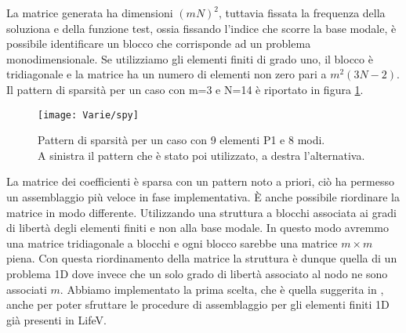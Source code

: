  La matrice generata ha dimensioni $(mN)^2$, tuttavia fissata
 la frequenza della soluziona e della funzione test, ossia fissando l'indice che scorre la base modale,
 \`e possibile identificare un blocco che corrisponde ad un problema monodimensionale.
Se utilizziamo gli elementi finiti di grado uno, il blocco \`e tridiagonale e
 la matrice ha un numero di elementi non zero pari a $m^2(3N-2)$. 
 Il pattern di sparsit\`a per un caso con m=3 e N=14 \`e riportato in figura \ref{fig:pattern}.
 \begin{figure}[!h]
    \centering
    \texttt{[image: Varie/spy]}
    \caption{Pattern di sparsit\`a per un caso con 9 elementi P1 e 8 modi.\\A sinistra il pattern che \`e stato poi utilizzato, a destra l'alternativa.}
    \label{fig:pattern}
\end{figure}
La matrice dei coefficienti \`e sparsa con un pattern noto a priori, ci\`o ha permesso 
 un assemblaggio pi\`u veloce in fase implementativa.
 \`E anche possibile riordinare la matrice in modo differente. Utilizzando una struttura 
 a blocchi associata ai gradi di libert\`a degli elementi finiti e non alla base modale.
 In questo modo avremmo una matrice tridiagonale a blocchi e ogni blocco sarebbe una matrice
 $m\times m$ piena. Con questa riordinamento della matrice la struttura \`e dunque quella 
 di un problema 1D dove invece che un solo grado di libert\`a associato al nodo ne sono associati $m$.
 Abbiamo implementato la prima scelta, che \`e quella suggerita in
 \cite{perotto:2008}, anche per poter sfruttare le procedure di assemblaggio 
 per gli elementi finiti 1D gi\`a presenti in LifeV.
\clearpage

